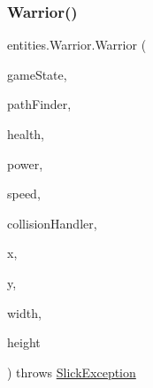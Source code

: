 \subsubsection{\texorpdfstring{Warrior()}{Warrior()}}
{\footnotesize\ttfamily entities.\+Warrior.\+Warrior (\begin{DoxyParamCaption}\item[{\mbox{\hyperlink{classstates_1_1_game_state}{Game\+State}}}]{game\+State,  }\item[{\mbox{\hyperlink{classentities_1_1_path_finder}{Path\+Finder}}}]{path\+Finder,  }\item[{int}]{health,  }\item[{int}]{power,  }\item[{float}]{speed,  }\item[{\mbox{\hyperlink{classentities_1_1_collision_handler}{Collision\+Handler}}}]{collision\+Handler,  }\item[{float}]{x,  }\item[{float}]{y,  }\item[{float}]{width,  }\item[{float}]{height }\end{DoxyParamCaption}) throws \mbox{\hyperlink{classorg_1_1newdawn_1_1slick_1_1_slick_exception}{Slick\+Exception}}\hspace{0.3cm}{\ttfamily [inline]}}


